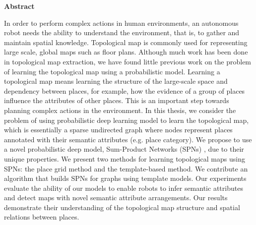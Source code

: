 \documentclass[10pt, titlepage]{article}
\theoremstyle{definition}
\begin{document}
\newpage
{} %
\begin{center}\Large \textbf{Abstract}\normalsize\end{center}
In order to perform complex actions in human environments, an autonomous robot needs the ability to understand the environment, that is, to gather and maintain spatial knowledge. Topological map is commonly used for representing large scale, global maps such as floor plans. Although much work has been done in topological map extraction, we have found little previous work on the problem of learning the topological map using a probabilistic model. Learning a topological map means learning the structure of the large-scale space and dependency between places, for example, how the evidence of a group of places influence the attributes of other places. This is an important step towards planning complex actions in the environment. In this thesis, we consider the problem of using probabilistic deep learning model to learn the topological map, which is essentially a sparse undirected graph where nodes represent places annotated with their semantic attributes (e.g. place category). We propose to use a novel probabilistic deep model, Sum-Product Networks (SPNs) \cite{poon2011sum}, due to their unique properties. We present two methods for learning topological maps using SPNs: the place grid method and the template-based method. We contribute an algorithm that builds SPNs for graphs using template models. Our experiments evaluate the ability of our models to enable robots to infer semantic attributes and detect maps with novel semantic attribute arrangements. Our results demonstrate their understanding of the topological map structure and spatial relations between places. 


\newpage
\tableofcontents
 
\newpage
{} %
\end{document}

